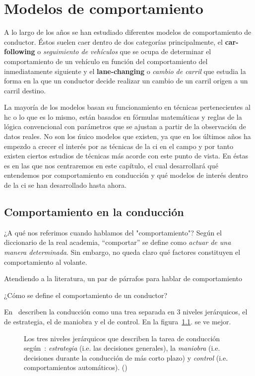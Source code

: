 \chapter{Modelos de comportamiento}
\label{ch:sota-behavior-models}

A lo largo de los años se han estudiado diferentes modelos de comportamiento de conductor. Éstos suelen caer dentro de dos categorías principalmente, el \textbf{car-following} o \textit{seguimiento de vehículos} que se ocupa de determinar el comportamiento de un vehículo en función del comportamiento del inmediatamente siguiente y el \textbf{lane-changing} o \textit{cambio de carril} que estudia la forma en la que un conductor decide realizar un cambio de un carril origen a un carril destino.

La mayoría de los modelos basan su funcionamiento en técnicas pertenecientes al \acrlong{hc} o lo que es lo mismo, están basados en fórmulas matemáticas y reglas de la lógica convencional con parámetros que se ajustan a partir de la observación de datos reales. No son los ńuico modelos que existen, ya que en los últimos años ha empezdo a crecer el interés por as técnicas de la \ac{ci} en el campo y por tanto existen ciertos estudios de técnicas más acorde con este punto de vista. En éstas es en las que nos centraremos en este capítulo, el cual desarrollará qué entendemos por comportamiento en conducción y qué modelos de interés dentro de la \ac{ci} se han desarrollado hasta ahora.

\section{Comportamiento en la conducción}

¿A qué nos referimos cuando hablamos del "comportamiento"? Según el diccionario de la real academia, \enquote{comportar} se define como \textit{actuar de una manera determinada}. Sin embargo, no queda claro qué factores constituyen el comportamiento al volante.

Atendiendo a la literatura, \TODO un par de párrafos para hablar de comportamiento

¿Cómo se define el comportamiento de un conductor?

En~\cite{michon1985critical} describen la conducción como una trea separada en $3$ niveles jerárquicos, el de estrategia, el de maniobra y el de control. En la figura~\ref{fig:three-levels-of-human-driving}. se ve mejor.
\begin{figure}
	\centering
{}
	\caption{Los tres niveles jerárquicos que describen la tarea de conducción según~\cite{michon1985critical}: \textit{estrategia} (i.e. las decisiones generales), la \textit{maniobra} (i.e. decisiones durante la conducción de más corto plazo) y \textit{control} (i.e. comportamientos automáticos). ()}
	\label{fig:three-levels-of-human-driving}
\end{figure}

